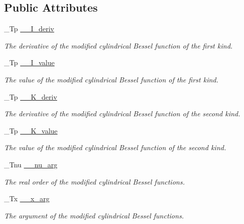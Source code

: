 \subsection*{Public Attributes}
\begin{DoxyCompactItemize}
\item 
\+\_\+\+Tp \hyperlink{struct____gnu__cxx_1_1____cyl__mod__bessel__t_a3b9bba9eeddddf229167deb269019fd7}{\+\_\+\+\_\+\+I\+\_\+deriv}
\begin{DoxyCompactList}\small\item\em The derivative of the modified cylindrical Bessel function of the first kind. \end{DoxyCompactList}\item 
\+\_\+\+Tp \hyperlink{struct____gnu__cxx_1_1____cyl__mod__bessel__t_ac4645f466e0030c92bc2035f5eeb9e58}{\+\_\+\+\_\+\+I\+\_\+value}
\begin{DoxyCompactList}\small\item\em The value of the modified cylindrical Bessel function of the first kind. \end{DoxyCompactList}\item 
\+\_\+\+Tp \hyperlink{struct____gnu__cxx_1_1____cyl__mod__bessel__t_a8f86a11fb265db76743d80e98be389be}{\+\_\+\+\_\+\+K\+\_\+deriv}
\begin{DoxyCompactList}\small\item\em The derivative of the modified cylindrical Bessel function of the second kind. \end{DoxyCompactList}\item 
\+\_\+\+Tp \hyperlink{struct____gnu__cxx_1_1____cyl__mod__bessel__t_a481e4c4537583c461654405c01c25566}{\+\_\+\+\_\+\+K\+\_\+value}
\begin{DoxyCompactList}\small\item\em The value of the modified cylindrical Bessel function of the second kind. \end{DoxyCompactList}\item 
\+\_\+\+Tnu \hyperlink{struct____gnu__cxx_1_1____cyl__mod__bessel__t_a482597cb5cc7de3449debeb0a451a757}{\+\_\+\+\_\+nu\+\_\+arg}
\begin{DoxyCompactList}\small\item\em The real order of the modified cylindrical Bessel functions. \end{DoxyCompactList}\item 
\+\_\+\+Tx \hyperlink{struct____gnu__cxx_1_1____cyl__mod__bessel__t_ad23dcffe64b074804b84abe4d0da7515}{\+\_\+\+\_\+x\+\_\+arg}
\begin{DoxyCompactList}\small\item\em The argument of the modified cylindrical Bessel functions. \end{DoxyCompactList}\end{DoxyCompactItemize}


